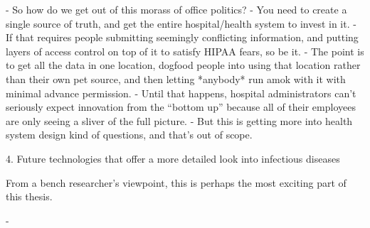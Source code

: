 - So how do we get out of this morass of office politics?
  - You need to create a single source of truth, and get the entire hospital/health system to invest in it.
  - If that requires people submitting seemingly conflicting information, and putting layers of access control on top of it to satisfy HIPAA fears, so be it.
  - The point is to get all the data in one location, dogfood people into using that location rather than their own pet source, and then letting *anybody* run amok with it with minimal advance permission.
  - Until that happens, hospital administrators can't seriously expect innovation from the ``bottom up'' because all of their employees are only seeing a sliver of the full picture.
  - But this is getting more into health system design kind of questions, and that's out of scope.
  
4. Future technologies that offer a more detailed look into infectious diseases

From a bench researcher's viewpoint, this is perhaps the most exciting part of this thesis.

- 